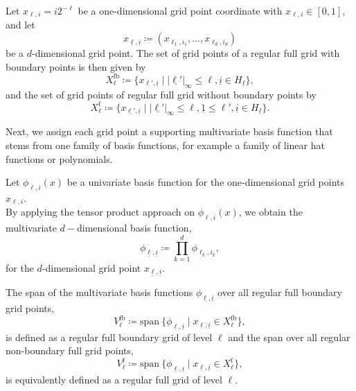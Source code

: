 \documentclass[
  a4paper,  %
  twoside,  %
  bibliography=totoc,
  headsepline,
  cleardoublepage=empty,
  parskip=half,
  draft=false
]{scrbook}
\begin{document}
\begin{definition}
Let $x_{\ell,i}=i2^{-\ell}$ be a one-dimensional grid point coordinate with $x_{\ell,i} \in [0,1]$, and let
\begin{equation}
x_{\underline{\ell},\underline{i}} \coloneqq (x_{\ell_1,i_1}, \dots, x_{\ell_d,i_d})
\end{equation}
be a $d$-dimensional grid point. The set of grid points of a regular full grid with boundary points is then given by
\begin{equation}
X^{\mathrm{fb}}_{\ell} \coloneqq \{x_{\underline{\ell'},\underline{i}} \mid |\underline{\ell'}|_{\infty} \leq \ell, \underline{i} \in H_{\underline{\ell}}\},
\end{equation}
and the set of grid points of regular full grid without boundary points by
\begin{equation}
X^{\mathrm{f}}_{\ell} \coloneqq \{x_{\underline{\ell'},\underline{i}} \mid |\underline{\ell'}|_{\infty} \leq \ell, \underline{1} \leq \ell',  \underline{i} \in H_{\underline{\ell}}\}.
\end{equation}
\end{definition}
%
Next, we assign each grid point a supporting multivariate basis function that stems from one family of basis functions, for example a family of linear hat functions or polynomials.

\begin{definition}
Let $\phi_{\ell,i}(x)$ be a univariate basis function for the one-dimensional grid points $x_{\ell,i}$.\\
By applying the tensor product approach on $\phi_{\ell,i}(x)$, we obtain the multivariate $d-$dimensional basis function,
\begin{equation}
\phi_{\underline{\ell},\underline{i}} \coloneqq \prod_{k=1}^{d} \phi_{\ell_k,i_k},
\end{equation}
for the $d$-dimensional grid point $x_{\underline{\ell},\underline{i}}$.
\label{def:basis_functions}
\end{definition}
%
\begin{definition}
The span of the multivariate basis functions $\phi_{\underline{\ell},\underline{i}}$ over all regular full boundary grid points,
\begin{equation}
V^{\mathrm{fb}}_{\ell} \coloneqq \mathrm{span}~ \{\phi_{\underline{\ell},\underline{i}} \mid x_{\underline{\ell},\underline{i}} \in X^{\mathrm{fb}}_{\ell}\},
\end{equation}
is defined as a regular full boundary grid of level $\ell$ and the span over all regular non-boundary full grid points,
\begin{equation}
V^{\mathrm{f}}_{\ell} \coloneqq \mathrm{span}~ \{\phi_{\underline{\ell},\underline{i}} \mid x_{\underline{\ell},\underline{i}} \in X^{\mathrm{f}}_{\ell}\},
\end{equation}
is equivalently defined as a regular full grid of level $\ell$.
\label{def:full_grid}
\end{definition}
\end{document}
